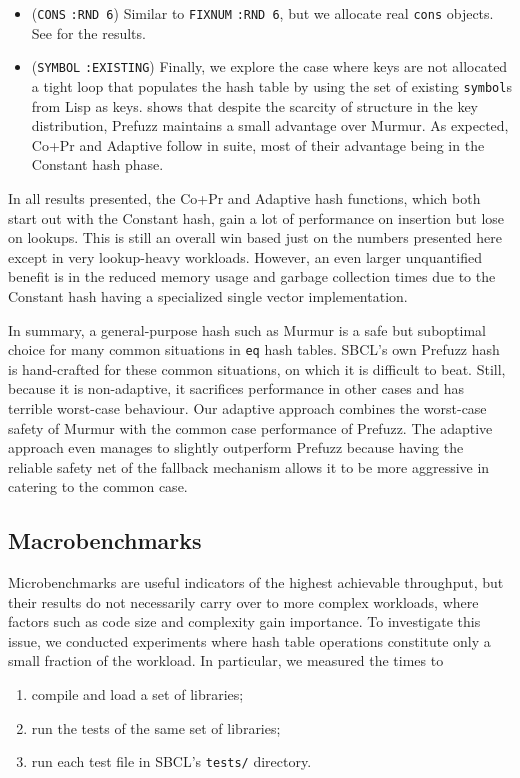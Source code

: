 \documentclass[sigconf]{acmart}
\newcommand*\lisp[1]{\texttt{#1}}
\renewcommand{\label}[1]{%
    \gdef\sfname{sf:##1}}%
\begin{document}
\begin{itemize}
\item{(\texttt{CONS} \texttt{:RND 6})}
Similar to \texttt{FIXNUM} \texttt{:RND 6}, but we allocate real \lisp{cons} objects.
See  for the results.

\item{(\texttt{SYMBOL} \texttt{:EXISTING})}
Finally, we explore the case where keys are not allocated a tight loop that populates the hash table by using the set of existing \lisp{symbol}s from Lisp as keys.
 shows that despite the scarcity of structure in the key distribution, Prefuzz maintains a small advantage over Murmur.
As expected, Co+Pr and Adaptive follow in suite, most of their advantage being in the Constant hash phase.
\end{itemize}

In all results presented, the Co+Pr and Adaptive hash functions, which both start out with the Constant hash, gain a lot of performance on insertion but lose on lookups.
This is still an overall win based just on the numbers presented here except in very lookup-heavy workloads.
However, an even larger unquantified benefit is in the reduced memory usage and garbage collection times due to the Constant hash having a specialized single vector implementation.

In summary, a general-purpose hash such as Murmur is a safe but suboptimal choice for many common situations in \lisp{eq} hash tables.
SBCL's own Prefuzz hash is hand-crafted for these common situations, on which it is difficult to beat.
Still, because it is non-adaptive, it sacrifices performance in other cases and has terrible worst-case behaviour.
Our adaptive approach combines the worst-case safety of Murmur with the common case performance of Prefuzz.
The adaptive approach even manages to slightly outperform Prefuzz because having the reliable safety net of the fallback mechanism allows it to be more aggressive in catering to the common case.

\subsection{Macrobenchmarks}
\label{sec:macrobenchmarks}

Microbenchmarks are useful indicators of the highest achievable throughput, but their results do not necessarily carry over to more complex workloads, where factors such as code size and complexity gain importance.
To investigate this issue, we conducted experiments where hash table operations constitute only a small fraction of the workload.
In particular, we measured the times to
\begin{enumerate}
\item compile and load a set of libraries;
\item run the tests of the same set of libraries;
\item run each test file in SBCL's \texttt{tests/} directory.
\end{enumerate}
\end{document}
